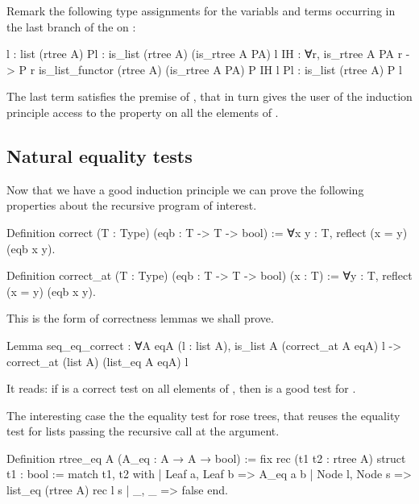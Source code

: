 \documentclass[a4paper, 11pt]{book}
\begin{document}
Remark the following type assignments for the variabls and terms occurring
in the last branch of the  on :

\begin{rocqcode}
l  : list (rtree A)
Pl : is_list (rtree A) (is_rtree A PA) l
IH : ∀r, is_rtree A PA r -> P r
is_list_functor (rtree A) (is_rtree A PA) P IH l Pl :
  is_list (rtree A) P l
\end{rocqcode}

The last term satisfies the premise of , that in turn
gives the user of the induction principle access to the property 
on all the elements of .

\subsection{Natural equality tests}

Now that we have a good induction principle we can prove the following
properties about the recursive program of interest.

\begin{rocqcode}
Definition correct (T : Type) (eqb : T -> T -> bool) :=
  ∀x y : T, reflect (x = y) (eqb x y).

Definition correct_at (T : Type) (eqb : T -> T -> bool) (x : T) :=
  ∀y : T, reflect (x = y) (eqb x y).
\end{rocqcode}

This is the form of correctness lemmas we shall prove.

\begin{rocqcode}
Lemma seq_eq_correct : ∀A eqA (l : list A),
  is_list A (correct_at A eqA) l ->
    correct_at (list A) (list_eq A eqA) l
\end{rocqcode}

It reads: if  is a correct test on all elements of ,
then  is a good test for .

The interesting case the the equality test for rose trees, that reuses
the equality test for lists  passing the recursive call
at the  argument.

\begin{rocqcode}
Definition rtree_eq A (A_eq : A → A → bool) :=
  fix rec (t1 t2 : rtree A) {struct t1} : bool :=
    match t1, t2 with
    | Leaf a, Leaf b => A_eq a b
    | Node l, Node s => list_eq (rtree A) rec l s
    | _, _ => false
    end.
\end{rocqcode}
\end{document}

